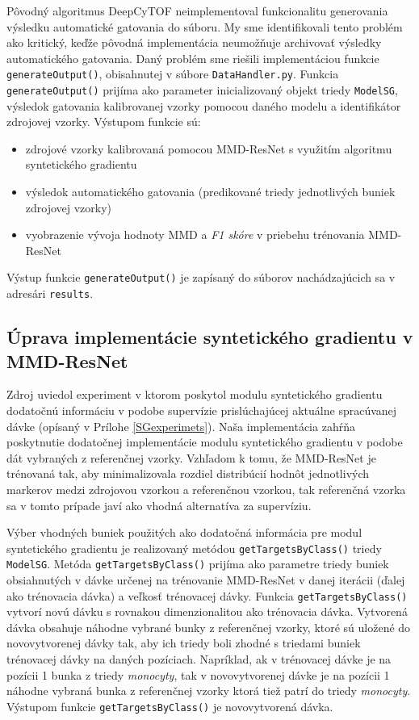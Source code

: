 Pôvodný algoritmus DeepCyTOF neimplementoval funkcionalitu generovania výsledku automatické gatovania do súboru. My sme identifikovali tento problém ako kritický, keďže pôvodná implementácia neumožňuje archivovať výsledky automatického gatovania. Daný problém sme riešili implementáciou funkcie \texttt{generateOutput()}, obisahnutej v súbore \texttt{DataHandler.py}. Funkcia \texttt{generateOutput()} prijíma ako parameter inicializovaný objekt triedy \texttt{ModelSG}, výsledok gatovania kalibrovanej vzorky pomocou daného modelu a identifikátor zdrojovej vzorky. Výstupom funkcie sú:
\begin{itemize}
    \item zdrojové vzorky kalibrovaná pomocou MMD-ResNet s využitím algoritmu syntetického gradientu
    \item výsledok automatického gatovania (predikované triedy jednotlivých buniek zdrojovej vzorky)
    \item vyobrazenie vývoja hodnoty MMD a \textit{F1 skóre} v priebehu trénovania MMD-ResNet
\end{itemize}
Výstup funkcie \texttt{generateOutput()} je zapísaný do súborov nachádzajúcich sa v adresári \texttt{results}.

\subsection{Úprava implementácie syntetického gradientu v MMD-ResNet}
\label{uprava_implementacie_ResNet}

Zdroj \cite{Jaderberg2016} uviedol experiment v ktorom poskytol modulu syntetického gradientu dodatočnú informáciu v podobe supervízie prislúchajúcej aktuálne spracúvanej dávke (opísaný v Prílohe \ref{SGexperimets}). Naša implementácia zahŕňa poskytnutie dodatočnej implementácie modulu syntetického gradientu v podobe dát vybraných z referenčnej vzorky. Vzhľadom k tomu, že MMD-ResNet je trénovaná tak, aby minimalizovala rozdiel distribúcií hodnôt jednotlivých markerov medzi zdrojovou vzorkou a referenčnou vzorkou, tak referenčná vzorka sa v tomto prípade javí ako vhodná alternatíva za supervíziu.

Výber vhodných buniek použitých ako dodatočná informácia pre modul syntetického gradientu je realizovaný metódou \texttt{getTargetsByClass()} triedy \texttt{ModelSG}. Metóda \texttt{getTargetsByClass()} prijíma ako parametre triedy buniek obsiahnutých v dávke určenej na trénovanie MMD-ResNet v danej iterácii (ďalej ako trénovacia dávka) a veľkosť trénovacej dávky. Funkcia \texttt{getTargetsByClass()} vytvorí novú dávku s rovnakou dimenzionalitou ako trénovacia dávka. Vytvorená dávka obsahuje náhodne vybrané bunky z referenčnej vzorky, ktoré sú uložené do novovytvorenej dávky tak, aby ich triedy boli zhodné s triedami buniek trénovacej dávky na daných pozíciach. Napríklad, ak v trénovacej dávke je na pozícii 1 bunka z triedy \textit{monocyty}, tak v novovytvorenej dávke je na pozícii 1 náhodne vybraná bunka z referenčnej vzorky ktorá tiež patrí do triedy \textit{monocyty}. Výstupom funkcie \texttt{getTargetsByClass()} je novovytvorená dávka.

